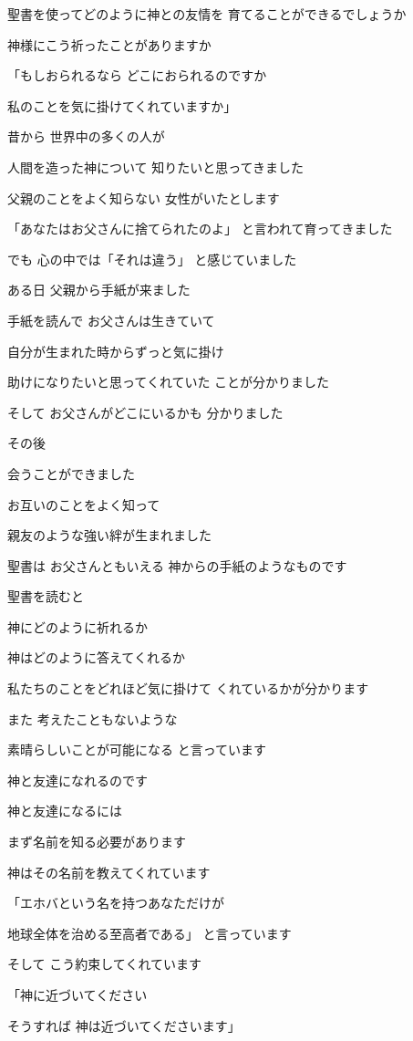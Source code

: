 \documentclass[twocolumn]{jsarticle}
\begin{document}
聖書を使ってどのように神との友情を
育てることができるでしょうか

神様にこう祈ったことがありますか

「もしおられるなら
どこにおられるのですか

私のことを気に掛けてくれていますか」

昔から 世界中の多くの人が

人間を造った神について
知りたいと思ってきました

父親のことをよく知らない
女性がいたとします

「あなたはお父さんに捨てられたのよ」
と言われて育ってきました

でも 心の中では「それは違う」
と感じていました

ある日 父親から手紙が来ました

手紙を読んで お父さんは生きていて

自分が生まれた時からずっと気に掛け

助けになりたいと思ってくれていた
ことが分かりました

そして お父さんがどこにいるかも
分かりました

その後

会うことができました

お互いのことをよく知って

親友のような強い絆が生まれました

聖書は お父さんともいえる
神からの手紙のようなものです

聖書を読むと

神にどのように祈れるか

神はどのように答えてくれるか

私たちのことをどれほど気に掛けて
くれているかが分かります

また 考えたこともないような

素晴らしいことが可能になる
と言っています

神と友達になれるのです

神と友達になるには

まず名前を知る必要があります

神はその名前を教えてくれています

「エホバという名を持つあなただけが

地球全体を治める至高者である」
と言っています

そして こう約束してくれています

「神に近づいてください

そうすれば
神は近づいてくださいます」
\end{document}
